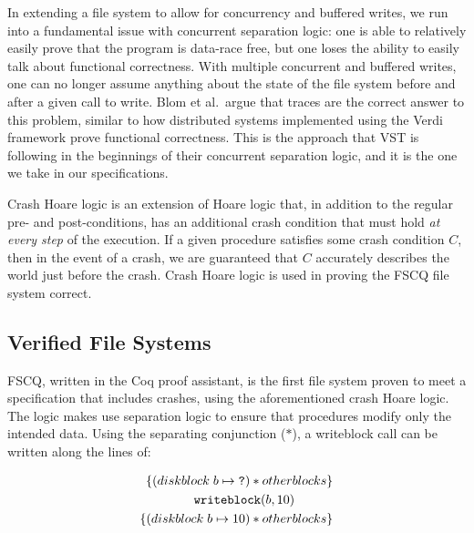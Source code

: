 In extending a file system to allow for concurrency and buffered writes, we run
into a fundamental issue with concurrent separation logic: one is able to
relatively easily prove that the program is data-race free, but one loses the
ability to easily talk about functional correctness. With multiple concurrent
and buffered writes, one can no longer assume anything about the state
of the file system before and after a given call to write. Blom et al.\ argue that
traces are the correct answer to this problem\cite{blom2015history}, similar to
how distributed systems implemented using the Verdi framework prove functional
correctness.\cite{wilcox2015verdi} This is the approach that VST is following in
the beginnings of their concurrent separation logic, and it is the one we take
in our specifications.


Crash Hoare logic\cite{chen2015using} is an extension of Hoare logic that, in
addition to the regular pre- and post-conditions, has an additional crash
condition that must hold \textit{at every step} of the execution. If a given
procedure satisfies some crash condition $C$, then in the event of a crash, we
are guaranteed that $C$ accurately describes the world just before the crash.
Crash Hoare logic is used in proving the FSCQ\cite{chen2015using} file system
correct.

\subsection{Verified File Systems}
FSCQ\cite{chen2015using}, written in the Coq proof assistant, is the first file
system proven to meet a specification that includes crashes, using the
aforementioned crash Hoare logic. The logic makes use separation logic to ensure
that procedures modify only the intended data. Using the separating conjunction
($\ast$), a writeblock call can be written along the lines of:

\begin{align*}
    \left\{ (diskblock\;b \mapsto \texttt{?}) \ast otherblocks \right\} \\ 
    \texttt{writeblock}(b, 10)\hspace{30px} \\
    \left\{ (diskblock\;b \mapsto 10) \ast otherblocks \right\}
\end{align*}

